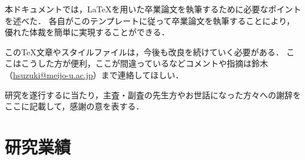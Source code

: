 \documentclass[a4j,11pt]{ujreport}
\begin{document}
本ドキュメントでは，{\LaTeX}を用いた卒業論文を執筆するために必要なポイントを述べた．
各自がこのテンプレートに従って卒業論文を執筆することにより，優れた体裁を簡単に実現することができる．

この{\TeX}文章やスタイルファイルは，今後も改良を続けていく必要がある．
ここはこうした方が便利，ここが間違っているなどコメントや指摘は鈴木（\url{hsuzuki@meijo-u.ac.jp}）まで連絡してほしい．
\cleardoublepage


\begin{gratitude}
研究を遂行するに当たり，主査・副査の先生方やお世話になった方々への謝辞をここに記載して，感謝の意を表する．
\end{gratitude}
\cleardoublepage




\cleardoublepage


\chapter*{研究業績}
\label{chap:Achievement}

\cleardoublepage

\appendix
\end{document}
